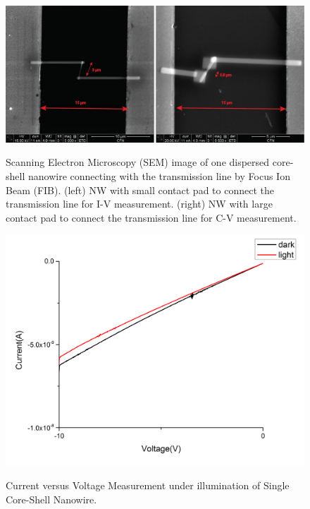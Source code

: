 \begin{figure}
  \caption{Scanning Electron Microscopy (SEM) image of one dispersed core-shell nanowire connecting with the transmission line by Focus Ion Beam (FIB). (left) NW with small contact pad to connect the transmission line for I-V measurement. (right) NW with large contact pad to connect the transmission line for C-V measurement.}

  \centering
  \includegraphics[width=\textwidth]{pictures/Data/ContactNW}
  \label{ContactNW}
\end{figure}

\begin{figure}
  \caption{Current versus Voltage Measurement under illumination of Single Core-Shell Nanowire.}
  \centering
  \includegraphics[width=\textwidth]{pictures/Data/CSNWIVlight}
  \label{CSNWIVlight}
\end{figure}

